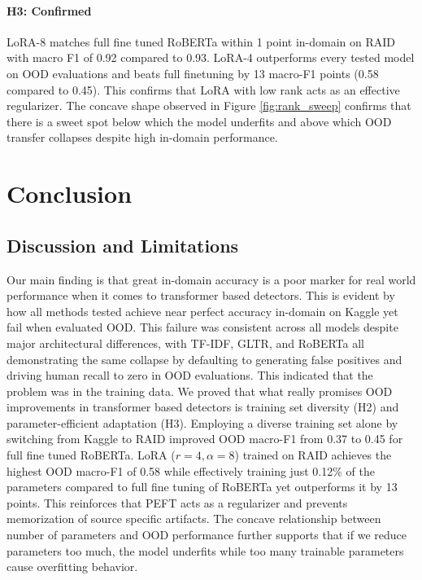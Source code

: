 \documentclass{article}
\begin{document}
\paragraph{H3: Confirmed}
LoRA-8 matches full fine tuned RoBERTa within 1 point in-domain on RAID with macro F1 of 0.92 compared to 0.93. LoRA-4 outperforms every tested model on OOD evaluations and beats full finetuning by 13 macro-F1 points (0.58 compared to 0.45). This confirms that LoRA with low rank acts as an effective regularizer. The concave shape observed in Figure \ref{fig:rank_sweep} confirms that there is a sweet spot below which the model underfits and above which OOD transfer collapses despite high in-domain performance.

\section{Conclusion}

\subsection{Discussion and Limitations}
Our main finding is that great in-domain accuracy is a poor marker for real world performance when it comes to transformer based detectors. This is evident by how all methods tested achieve near perfect accuracy in-domain on Kaggle yet fail when evaluated OOD. This failure was consistent across all models despite major architectural differences, with TF-IDF, GLTR, and RoBERTa all demonstrating the same collapse by defaulting to generating false positives and driving human recall to zero in OOD evaluations. This indicated that the problem was in the training data. We proved that what really promises OOD improvements in transformer based detectors is training set diversity (H2) and parameter-efficient adaptation (H3). Employing a diverse training set alone by switching from Kaggle to RAID improved OOD macro-F1 from 0.37 to 0.45 for full fine tuned RoBERTa. LoRA ($r{=}4,\alpha=8$) trained on RAID achieves the highest OOD macro-F1 of 0.58 while effectively training just 0.12\% of the parameters compared to full fine tuning of RoBERTa yet outperforms it by 13 points. This reinforces that PEFT acts as a regularizer and prevents memorization of source specific artifacts. The concave relationship between number of parameters and OOD performance further supports that if we reduce parameters too much, the model underfits while too many trainable parameters cause overfitting behavior.
\end{document}
